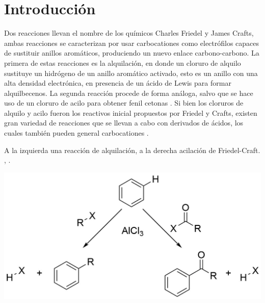 \documentclass[fleqn,11pt]{SelfArx}
\begin{document}
\flushbottom %

\maketitle %


\thispagestyle{empty} %
\renewcommand{\tablename}{Tabla} 



\section*{Introducci\'on} %
Dos reacciones llevan el nombre de los químicos Charles Friedel y James Crafts, ambas reacciones se caracterizan por usar carbocationes como electrófilos capaces de sustituir anillos aromáticos, produciendo un nuevo enlace carbono-carbono. La primera de estas reacciones es la alquilación, en donde un cloruro de alquilo sustituye un hidrógeno de un anillo aromático activado, esto es un anillo con una alta densidad electrónica, en presencia de un ácido de Lewis para formar alquilbecenos. La segunda reacción procede de forma análoga, salvo que se hace uso de un cloruro de acilo para obtener fenil cetonas \cite{Wade2013}. Si bien los cloruros de alquilo y acilo fueron los reactivos inicial propuestos por Friedel y Crafts, existen gran variedad de reacciones que se llevan a cabo con derivados de ácidos, los cuales también pueden general carbocationes \cite{Wade2013}.
\begin{scheme}[h]
	\centering
	\caption{A la izquierda una reacción de alquilación, a la derecha acilación de Friedel-Craft. ,  \cite{Wade2013}.}
	\includegraphics[width=1.\linewidth]{structures/FriedelCraft.png}
\end{scheme}
\newpage
\end{document}
